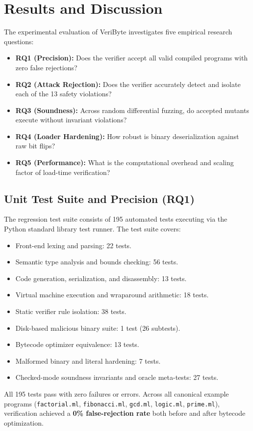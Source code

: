 \documentclass[conference]{IEEEtran}
\begin{document}
\section{Results and Discussion}

The experimental evaluation of VeriByte investigates five empirical research questions:
\begin{itemize}
    \item \textbf{RQ1 (Precision):} Does the verifier accept all valid compiled programs with zero false rejections?
    \item \textbf{RQ2 (Attack Rejection):} Does the verifier accurately detect and isolate each of the 13 safety violations?
    \item \textbf{RQ3 (Soundness):} Across random differential fuzzing, do accepted mutants execute without invariant violations?
    \item \textbf{RQ4 (Loader Hardening):} How robust is binary deserialization against raw bit flips?
    \item \textbf{RQ5 (Performance):} What is the computational overhead and scaling factor of load-time verification?
\end{itemize}

\subsection{Unit Test Suite and Precision (RQ1)}
The regression test suite consists of 195 automated tests executing via the Python standard library test runner. The test suite covers:
\begin{itemize}
    \item Front-end lexing and parsing: 22 tests.
    \item Semantic type analysis and bounds checking: 56 tests.
    \item Code generation, serialization, and disassembly: 13 tests.
    \item Virtual machine execution and wraparound arithmetic: 18 tests.
    \item Static verifier rule isolation: 38 tests.
    \item Disk-based malicious binary suite: 1 test (26 subtests).
    \item Bytecode optimizer equivalence: 13 tests.
    \item Malformed binary and literal hardening: 7 tests.
    \item Checked-mode soundness invariants and oracle meta-tests: 27 tests.
\end{itemize}
All 195 tests pass with zero failures or errors. Across all canonical example programs (\texttt{factorial.ml}, \texttt{fibonacci.ml}, \texttt{gcd.ml}, \texttt{logic.ml}, \texttt{prime.ml}), verification achieved a \textbf{0\% false-rejection rate} both before and after bytecode optimization.
\end{document}
